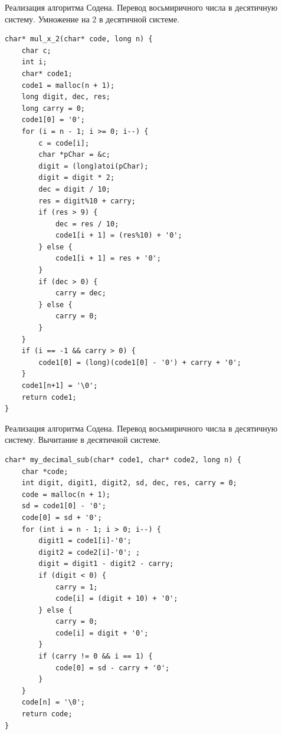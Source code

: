 \documentclass[14pt, russian]{scrartcl}
\begin{document}
\newpage
\begin{code}
\caption{Реализация алгоритма Содена. Перевод восьмиричного числа в десятичную систему. Умножение на 2 в десятичной системе.}
\label{lst:octaladd}
\begin{verbatim}
char* mul_x_2(char* code, long n) {
    char c;
    int i;
    char* code1;
    code1 = malloc(n + 1);
    long digit, dec, res;
    long carry = 0;
    code1[0] = '0';
    for (i = n - 1; i >= 0; i--) {
        c = code[i];
        char *pChar = &c;
        digit = (long)atoi(pChar); 
        digit = digit * 2;
        dec = digit / 10;
        res = digit%10 + carry;
        if (res > 9) {
            dec = res / 10;
            code1[i + 1] = (res%10) + '0';
        } else {
            code1[i + 1] = res + '0';
        }
        if (dec > 0) {
            carry = dec;
        } else {
            carry = 0;
        }
    }
    if (i == -1 && carry > 0) {
        code1[0] = (long)(code1[0] - '0') + carry + '0';
    }
    code1[n+1] = '\0';
    return code1;
}
\end{verbatim}
\end{code}

\newpage
\begin{code}
\caption{Реализация алгоритма Содена. Перевод восьмиричного числа в десятичную систему. Вычитание в десятичной системе.}
\label{lst:octaladd}
\begin{verbatim}
char* my_decimal_sub(char* code1, char* code2, long n) {
    char *code;
    int digit, digit1, digit2, sd, dec, res, carry = 0;
    code = malloc(n + 1);
    sd = code1[0] - '0'; 
    code[0] = sd + '0';
    for (int i = n - 1; i > 0; i--) {
        digit1 = code1[i]-'0'; 
        digit2 = code2[i]-'0'; ;
        digit = digit1 - digit2 - carry;
        if (digit < 0) {
            carry = 1;
            code[i] = (digit + 10) + '0';
        } else {
            carry = 0;
            code[i] = digit + '0';
        }
        if (carry != 0 && i == 1) {
            code[0] = sd - carry + '0';
        }
    } 
    code[n] = '\0';
    return code;
}
\end{verbatim}
\end{code}
\end{document}
